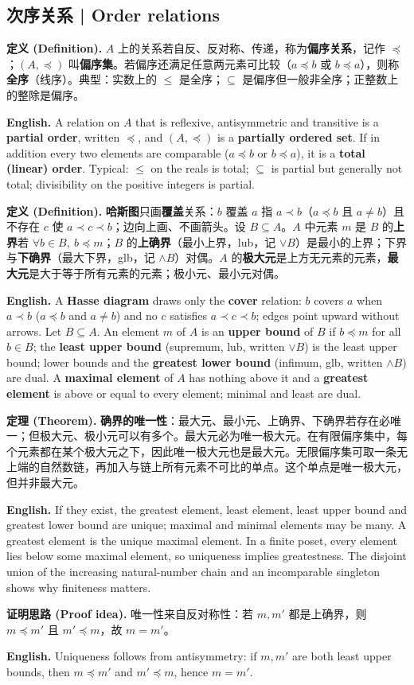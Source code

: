 \documentclass[UTF8,11pt,a4paper]{ctexart}
\newcommand{\EN}[1]{\par\noindent \textbf{English.} #1\par}
\newcommand{\DEF}[2]{\par\noindent\textbf{定义 (Definition).} #1\par\EN{#2}}
\newcommand{\THM}[2]{\par\noindent\textbf{定理 (Theorem).} #1\par\EN{#2}}
\newcommand{\PRF}[2]{\par\noindent\textbf{证明思路 (Proof idea).} #1\par\EN{#2}}
\begin{document}
\subsection{次序关系 | Order relations}
\DEF{$A$ 上的关系若自反、反对称、传递，称为\textbf{偏序关系}，记作 $\preccurlyeq$；$(A,\preccurlyeq)$ 叫\textbf{偏序集}。若偏序还满足任意两元素可比较（$a\preccurlyeq b$ 或 $b\preccurlyeq a$），则称\textbf{全序}（线序）。典型：实数上的 $\le$ 是全序；$\subseteq$ 是偏序但一般非全序；正整数上的整除是偏序。}{A relation on $A$ that is reflexive, antisymmetric and transitive is a \textbf{partial order}, written $\preccurlyeq$, and $(A,\preccurlyeq)$ is a \textbf{partially ordered set}. If in addition every two elements are comparable ($a\preccurlyeq b$ or $b\preccurlyeq a$), it is a \textbf{total (linear) order}. Typical: $\le$ on the reals is total; $\subseteq$ is partial but generally not total; divisibility on the positive integers is partial.}
\DEF{\textbf{哈斯图}只画\textbf{覆盖}关系：$b$ 覆盖 $a$ 指 $a\prec b$（$a\preccurlyeq b$ 且 $a\ne b$）且不存在 $c$ 使 $a\prec c\prec b$；边向上画、不画箭头。设 $B\subseteq A$。$A$ 中元素 $m$ 是 $B$ 的\textbf{上界}若 $\forall b\in B,\ b\preccurlyeq m$；$B$ 的\textbf{上确界}（最小上界，lub，记 $\vee B$）是最小的上界；下界与\textbf{下确界}（最大下界，glb，记 $\wedge B$）对偶。$A$ 的\textbf{极大元}是上方无元素的元素，\textbf{最大元}是大于等于所有元素的元素；极小元、最小元对偶。}{A \textbf{Hasse diagram} draws only the \textbf{cover} relation: $b$ covers $a$ when $a\prec b$ ($a\preccurlyeq b$ and $a\ne b$) and no $c$ satisfies $a\prec c\prec b$; edges point upward without arrows. Let $B\subseteq A$. An element $m$ of $A$ is an \textbf{upper bound} of $B$ if $b\preccurlyeq m$ for all $b\in B$; the \textbf{least upper bound} (supremum, lub, written $\vee B$) is the least upper bound; lower bounds and the \textbf{greatest lower bound} (infimum, glb, written $\wedge B$) are dual. A \textbf{maximal element} of $A$ has nothing above it and a \textbf{greatest element} is above or equal to every element; minimal and least are dual.}
\THM{\textbf{确界的唯一性}：最大元、最小元、上确界、下确界若存在必唯一；但极大元、极小元可以有多个。最大元必为唯一极大元。在有限偏序集中，每个元素都在某个极大元之下，因此唯一极大元也是最大元。无限偏序集可取一条无上端的自然数链，再加入与链上所有元素不可比的单点。这个单点是唯一极大元，但并非最大元。}{If they exist, the greatest element, least element, least upper bound and greatest lower bound are unique; maximal and minimal elements may be many. A greatest element is the unique maximal element. In a finite poset, every element lies below some maximal element, so uniqueness implies greatestness. The disjoint union of the increasing natural-number chain and an incomparable singleton shows why finiteness matters.}
\PRF{唯一性来自反对称性：若 $m,m'$ 都是上确界，则 $m\preccurlyeq m'$ 且 $m'\preccurlyeq m$，故 $m=m'$。}{Uniqueness follows from antisymmetry: if $m,m'$ are both least upper bounds, then $m\preccurlyeq m'$ and $m'\preccurlyeq m$, hence $m=m'$.}
\end{document}
